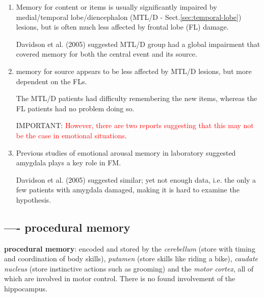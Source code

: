 \begin{enumerate}
 
  \item Memory for content or items is usually significantly impaired by
  medial/temporal lobe/diencephalon (MTL/D - Sect.\ref{sec:temporal-lobe}) lesions,
  but is often much less affected by frontal lobe (FL) damage.

Davidson et al. (2005) suggested MTL/D group had a global impairment that
covered memory for both the central event and its source.

  \item memory for source appears to be less affected by MTL/D lesions, but more
  dependent on the FLs. 
  
  The MTL/D patients had difficulty remembering the new items, whereas the FL
  patients had no problem doing so.
  
IMPORTANT: \textcolor{red}{However, there are two reports suggesting that this
may not be the case in emotional situations}.

  \item Previous studies of emotional arousal memory in laboratory suggested
  amygdala plays a key role in FM.
  
Davidson et al. (2005) suggested similar; yet not enough data, i.e. the only a
few patients with amygdala damaged, making it is hard to examine the hypothesis.
\end{enumerate}


% 

\subsection{---- procedural memory}
\label{sec:LTM-procedural-memory}
\label{sec:implicit-memory}
\label{sec:procedural-memory}

{\bf procedural memory}:  encoded and stored by the {\it cerebellum} (store with
timing and coordination of body skills), {\it putamen} (store skills like riding
a bike), {\it caudate nucleus} (store instinctive actions such as grooming) and
the {\it motor cortex}, all of which are involved in motor control. There is no
found involvement of the hippocampus.
  

